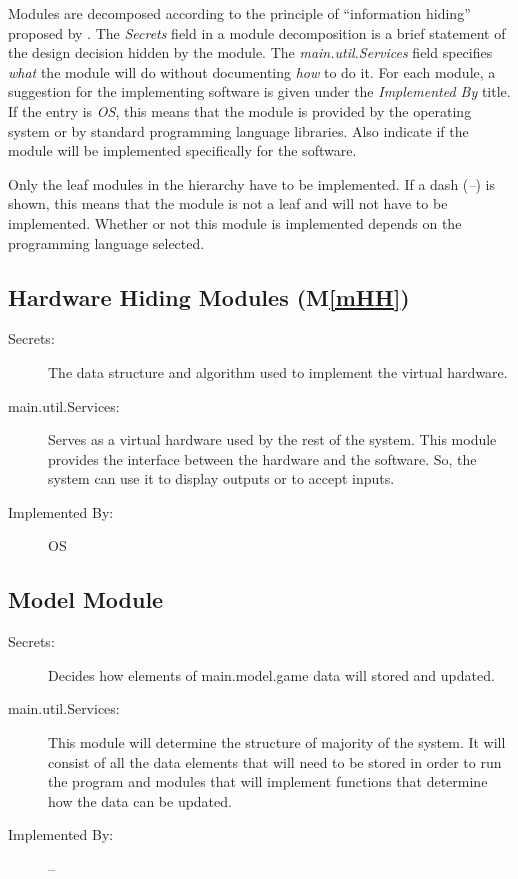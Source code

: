 \documentclass[12pt, titlepage]{article}
\newcommand{\mref}[1]{M\ref{#1}}
\begin{document}
Modules are decomposed according to the principle of ``information hiding''
proposed by \citet{ParnasEtAl1984}. The \emph{Secrets} field in a module
decomposition is a brief statement of the design decision hidden by the
module. The \emph{main.util.Services} field specifies \emph{what} the module will do
without documenting \emph{how} to do it. For each module, a suggestion for the
implementing software is given under the \emph{Implemented By} title. If the
entry is \emph{OS}, this means that the module is provided by the operating
system or by standard programming language libraries.  Also indicate if the
module will be implemented specifically for the software.

Only the leaf modules in the
hierarchy have to be implemented. If a dash (\emph{--}) is shown, this means
that the module is not a leaf and will not have to be implemented. Whether or
not this module is implemented depends on the programming language
selected.

\subsection{Hardware Hiding Modules (\mref{mHH})}

\begin{description}
\item[Secrets:]The data structure and algorithm used to implement the virtual
  hardware.
\item[main.util.Services:]Serves as a virtual hardware used by the rest of the
  system. This module provides the interface between the hardware and the
  software. So, the system can use it to display outputs or to accept inputs.
\item[Implemented By:] OS
\end{description}


\subsection{Model Module}
    \begin{description}
    \item[Secrets:] Decides how elements of main.model.game data will stored and updated.
    \item[main.util.Services:] This module will determine the structure of majority of the system. It will consist of all the data elements that will need to be stored in order to run the program and modules that will implement functions that determine how the data can be updated.
    \item[Implemented By:] --
    \end{description}
\end{document}
